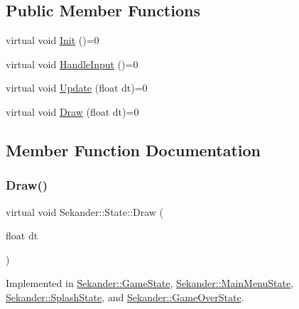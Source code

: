 \subsection*{Public Member Functions}
\begin{DoxyCompactItemize}
\item 
virtual void \hyperlink{classSekander_1_1State_a171be4b77d4c13e01849b867bd3fa8f5}{Init} ()=0
\item 
virtual void \hyperlink{classSekander_1_1State_ad55ae42f5887db5745fda9f2bd30aaa3}{Handle\+Input} ()=0
\item 
virtual void \hyperlink{classSekander_1_1State_a08d49e399db6f68247f410f7fddc7963}{Update} (float dt)=0
\item 
virtual void \hyperlink{classSekander_1_1State_a6ae7c2de1985461232a3ad694ca736b5}{Draw} (float dt)=0
\end{DoxyCompactItemize}


\subsection{Member Function Documentation}
\mbox{\label{classSekander_1_1State_a6ae7c2de1985461232a3ad694ca736b5}} 
\subsubsection{\texorpdfstring{Draw()}{Draw()}}
{\footnotesize\ttfamily virtual void Sekander\+::\+State\+::\+Draw (\begin{DoxyParamCaption}\item[{float}]{dt }\end{DoxyParamCaption})\hspace{0.3cm}{\ttfamily [pure virtual]}}



Implemented in \hyperlink{classSekander_1_1GameState_ae940d623e220e069c6574810c5d083be}{Sekander\+::\+Game\+State}, \hyperlink{classSekander_1_1MainMenuState_a18aceffe0c53cf90263c24665de379c1}{Sekander\+::\+Main\+Menu\+State}, \hyperlink{classSekander_1_1SplashState_ad372f3712cd5d3207e44a50dc70bed46}{Sekander\+::\+Splash\+State}, and \hyperlink{classSekander_1_1GameOverState_af2407df4e95d8add41ed995157bc0905}{Sekander\+::\+Game\+Over\+State}.

\mbox{\label{classSekander_1_1State_ad55ae42f5887db5745fda9f2bd30aaa3}} 
